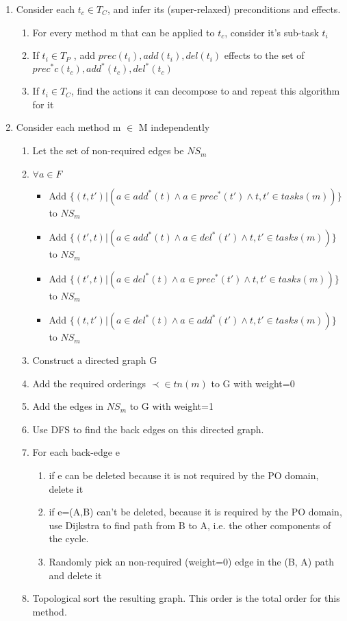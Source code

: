 \begin{enumerate}
\item Consider each $t_c \in T_C$, and infer its (super-relaxed) preconditions and effects.
	\begin{enumerate}
	\item For every method m that can be applied to $t_c$, consider it's sub-task $t_i$
	\item If $t_i \in T_P$ , add $prec(t_i), add(t_i), del(t_i)$ effects to the set of $prec^{*}c(t_c), add^{*}(t_c), del^{*}(t_c)$
	\item If $t_i \in T_C$, find the actions it can decompose to and repeat this algorithm for it
	\end{enumerate}
\item Consider each method m $\in$ M independently
	\begin{enumerate}	
		\item Let the set of non-required edges be $NS_m$
		\item $\forall a \in F$
		\begin{itemize}			
			\item Add $\{ (t, t') |  (a \in add^{*}(t) \land a \in prec^{*}(t') \land t, t' \in tasks(m) ) \}$ to $NS_m$ 
			\item Add $\{ (t', t) |  (a \in add^{*}(t) \land a \in del^{*}(t') \land t, t' \in tasks(m) ) \}$ to $NS_m$ 
			\item Add $\{ (t', t) |  (a \in del^{*}(t) \land a \in prec^{*}(t') \land t, t' \in tasks(m) ) \}$ to $NS_m$ 
			\item Add $\{ (t, t') |  (a \in del^{*}(t) \land a \in add^{*}(t') \land t, t' \in tasks(m) ) \}$ to $NS_m$ 
		\end{itemize}
		\item Construct a directed graph G
		\item Add the required orderings $\prec \in tn(m)$ to G with weight=0
		\item Add the edges in $NS_m$ to G with weight=1 \newline
		\item Use DFS to find the back edges on this directed graph.
		\item For each back-edge e
		\begin{enumerate}
			\item if e can be deleted because it is not required by the PO domain, delete it
			\item if e=(A,B) can't be deleted, because it is required by the PO domain, use Dijkstra to find path from B to A, i.e. the other components of the cycle.
			\item Randomly pick an non-required (weight=0) edge in the (B, A) path and delete it
		\end{enumerate}
		\item Topological sort the resulting graph. This order is the total order for this method.
	\end{enumerate}
\end{enumerate}



